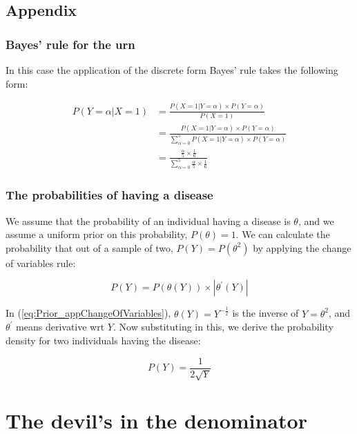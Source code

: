 \documentclass[11pt,fullpage]{book}
\begin{document}
\section{Appendix}
\subsection{Bayes' rule for the urn}\label{app:Prior_bayesUrn}
In this case the application of the discrete form Bayes' rule takes the following form:

\begin{equation}\label{eq:Prior_bayesDiscreteForm}
\begin{align}
P(Y=\alpha|X=1) &= \frac{P(X=1|Y=\alpha)\times P(Y=\alpha)}{P(X=1)}\\
&= \frac{P(X=1|Y=\alpha)\times P(Y=\alpha)}{\sum\limits_{\alpha=0}^{5}P(X=1|Y=\alpha)\times P(Y=\alpha)}\\
&= \frac{\frac{\alpha}{5}\times \frac{1}{6}}{\sum\limits_{\alpha=0}^{5}\frac{\alpha}{5}\times\frac{1}{6}}
\end{align}
\end{equation}

\subsection{The probabilities of having a disease}\label{app:Prior_diseaseJeffreys}
We assume that the probability of an individual having a disease is $\theta$, and we assume a uniform prior on this probability, $P(\theta)=1$. We can calculate the probability that out of a sample of two, $P(Y)=P(\theta^2)$ by applying the change of variables rule:

\begin{equation}\label{eq:Prior_appChangeOfVariables}
P(Y) = P(\theta(Y))\times |\theta^\prime(Y)|
\end{equation}

In (\ref{eq:Prior_appChangeOfVariables}), $\theta(Y)=Y^{-\frac{1}{2}}$ is the inverse of $Y=\theta^2$, and $\theta^\prime$ means derivative wrt $Y$. Now substituting in this, we derive the probability density for two individuals having the disease:

\begin{equation}\label{eq:Prior_appChangeOfVariablesSolved}
P(Y) = \frac{1}{2\sqrt{Y}}
\end{equation}


\chapter{The devil's in the denominator}\label{chap:denominator}
\end{document}
